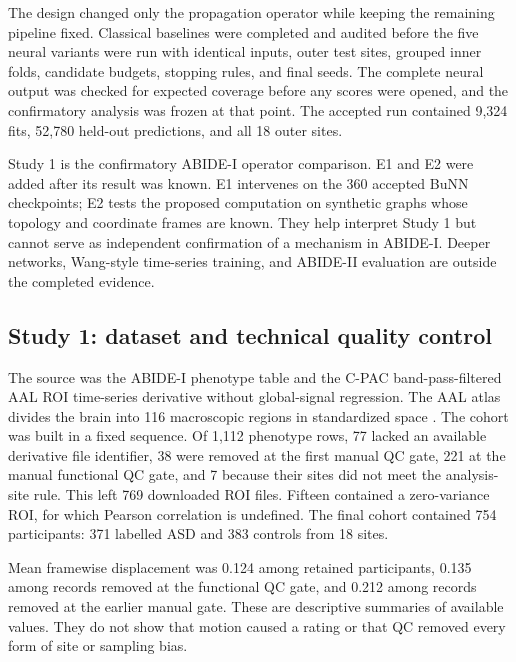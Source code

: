 \documentclass[11pt,a4paper]{article}
\begin{document}
The design changed only the propagation operator while keeping the remaining
pipeline fixed. Classical baselines were completed and audited before the five
neural variants were run with identical inputs, outer test sites, grouped
inner folds, candidate budgets, stopping rules, and final seeds. The complete
neural output was checked for expected coverage before any scores were opened,
and the confirmatory analysis was frozen at that point. The accepted run
contained 9,324 fits, 52,780 held-out predictions, and all 18 outer sites.

Study 1 is the confirmatory ABIDE-I operator comparison. E1 and E2 were added
after its result was known. E1 intervenes on the 360 accepted BuNN checkpoints;
E2 tests the proposed computation on synthetic graphs whose topology and
coordinate frames are known. They help interpret Study 1 but cannot serve as
independent confirmation of a mechanism in ABIDE-I. Deeper networks,
Wang-style time-series training, and ABIDE-II evaluation are outside the
completed evidence.

\subsection{Study 1: dataset and technical quality control}

The source was the ABIDE-I phenotype table and the C-PAC band-pass-filtered AAL
ROI time-series derivative without global-signal regression. The AAL atlas
divides the brain into 116 macroscopic regions in standardized space
\cite{tzourio2002aal}. The cohort was built in a fixed sequence. Of 1,112
phenotype rows, 77 lacked an available derivative file identifier, 38 were
removed at the first manual QC gate, 221 at the manual functional QC gate, and
7 because their sites did not meet the analysis-site rule. This left 769
downloaded ROI files. Fifteen contained a zero-variance ROI, for which Pearson
correlation is undefined. The final cohort contained 754 participants: 371
labelled ASD and 383 controls from 18 sites.

\begin{table}[htbp]
\centering
\caption{Participant accounting from the public phenotype table to the frozen
analysis cohort. The two manual gates and the zero-variance check are distinct
steps.}
\label{tab:qc-cascade}
\small

\end{table}

Mean framewise displacement was 0.124 among retained participants, 0.135 among
records removed at the functional QC gate, and 0.212 among records removed at
the earlier manual gate. These are descriptive summaries of available values.
They do not show that motion caused a rating or that QC removed every form of
site or sampling bias.
\end{document}
